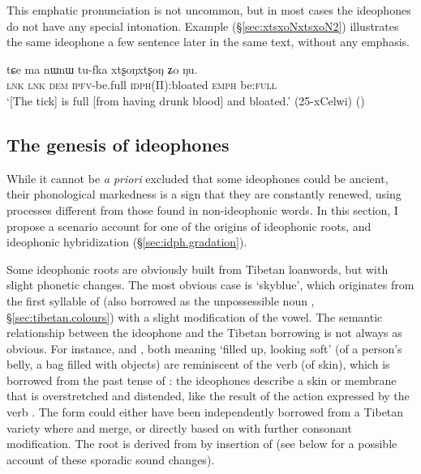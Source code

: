 This emphatic pronunciation is not uncommon, but in most cases the ideophones do not have any special intonation. Example (§\ref{sec:xtsxoNxtsxoN2}) illustrates the same ideophone  a few sentence later in the same text, without any emphasis.

\begin{exe}
\ex \label{sec:xtsxoNxtsxoN2}
\gll tɕe ma nɯnɯ tu-fka xtʂoŋxtʂoŋ ʑo ŋu. \\
\textsc{lnk} \textsc{lnk} \textsc{dem} \textsc{ipfv}-be.full \textsc{idph}(II):bloated \textsc{emph} be:\textsc{full} \\
\glt `[The tick] is full [from having drunk blood] and bloated.' (25-xCelwi)
()
\end{exe}

\subsection{The genesis of ideophones} \label{sec:genesis.idph}
While it cannot be \textit{a priori} excluded that some ideophones could be ancient, their phonological markedness is a sign that they are constantly renewed, using processes different from those found in non-ideophonic words. In this section, I propose a scenario account for one of the origins of ideophonic roots, and  ideophonic hybridization (§\ref{sec:idph.gradation}).

Some ideophonic roots are obviously built from Tibetan loanwords, but with slight phonetic changes. The most obvious case is  `skyblue', which originates from the first syllable of  (also borrowed as the unpossessible noun , §\ref{sec:tibetan.colours}) with a slight modification of the vowel. The semantic relationship between the ideophone and the Tibetan borrowing is not always as obvious. For instance,  and , both meaning `filled up, looking soft' (of a person's belly, a bag filled with objects) are reminiscent of the verb  (of skin), which is borrowed from the past tense of : the ideophones describe a skin or membrane that is overstretched and distended, like the result of the action expressed by the verb . The form  could either have been independently borrowed from a Tibetan variety where  and  merge, or directly based on  with further consonant modification. The root  is derived from  by insertion of  (see below for a possible account of these sporadic sound changes).
 
